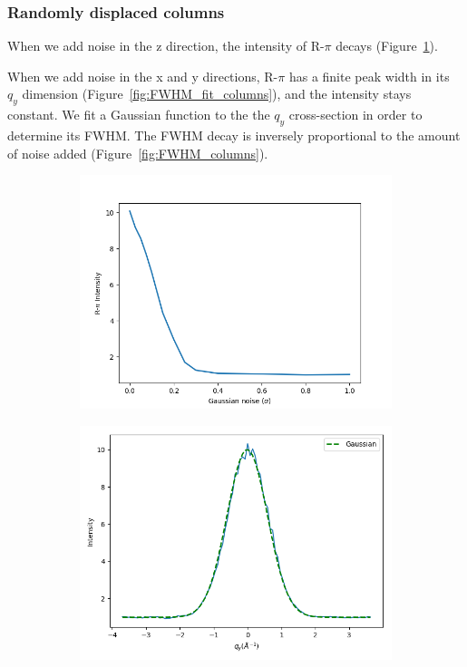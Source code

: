 \documentclass{article}
\begin{document}
  \subsubsection{Randomly displaced columns}

  When we add noise in the z direction, the intensity of R-$\pi$ decays
  (Figure~\ref{fig:z_noise_columns}).

  When we add noise in the x and y directions, R-$\pi$ has a finite peak width
  in its $q_y$ dimension (Figure~\ref{fig:FWHM_fit_columns}), and the intensity
  stays constant. We fit a Gaussian function to the the $q_y$ cross-section in
  order to determine its FWHM. The FWHM decay is inversely proportional to the
  amount of noise added (Figure~\ref{fig:FWHM_columns}). 

  \begin{figure}[!htb]
  \centering
  \begin{subfigure}{0.32\textwidth}
  \includegraphics[width=\textwidth]{random_columns_z_noise.png}
  \caption{}\label{fig:z_noise_columns}
  \end{subfigure}
  \begin{subfigure}{0.32\textwidth}
  \includegraphics[width=\textwidth]{random_columns_gaussian.png}

\end{subfigure}
\end{figure}
\end{document}
